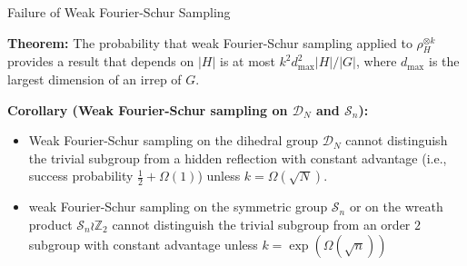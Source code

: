 \documentclass[slideColor]{prosper}
\newcommand{\Z}{{\mathbb{Z}}}
\newcommand{\cD}{{\mathcal{D}}}
\newcommand{\cS}{{\mathcal{S}}}
\renewcommand{\>}{\rangle}
\newcommand{\<}{\langle}
\newcommand{\ot}{\otimes}
\begin{document}
\begin{slide}{Failure of Weak Fourier-Schur Sampling}

{\bf Theorem:} The probability that weak Fourier-Schur sampling applied to $\rho_H^{\ot k}$ provides a result that depends on $|H|$ is at most $k^2 d_{\max}^2 |H| / |G|$, where $d_{\max}$ is the largest dimension of an irrep of $G$.

\bigskip

{\bf Corollary (Weak Fourier-Schur sampling on $\cD_N$ and $\cS_n$):}
\begin{itemize}
\item Weak Fourier-Schur sampling on the dihedral group $\cD_N$ cannot
distinguish the trivial subgroup from a hidden reflection with
constant advantage (i.e., success probability $\frac{1}{2} + \Omega(1)$) unless $k = \Omega(\sqrt{N})$. 
\item weak Fourier-Schur sampling on the symmetric group $\cS_n$ or on the
wreath product $\cS_n\wr\Z_2$ cannot
distinguish the trivial subgroup from an order $2$ subgroup with constant
advantage unless $k=\exp(\Omega(\sqrt{n}))$
\end{itemize}

\end{slide}
\end{document}
